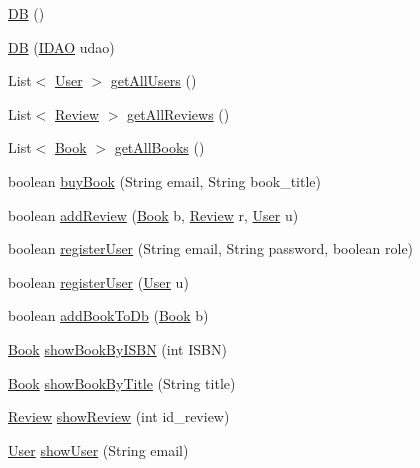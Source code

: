 \begin{DoxyCompactItemize}
\item 
\hyperlink{classdb_1_1_d_b_a1f91d243772e38f908a993724eb01243}{DB} ()
\item 
\hyperlink{classdb_1_1_d_b_afdc419eebbdef14244d859ac59d19dc7}{DB} (\hyperlink{interfacedb_1_1_i_d_a_o}{I\+D\+AO} udao)
\item 
List$<$ \hyperlink{classserver_1_1data_1_1_user}{User} $>$ \hyperlink{classdb_1_1_d_b_ad02e4c78f9afe64af34fb2e5889ce501}{get\+All\+Users} ()
\item 
List$<$ \hyperlink{classserver_1_1data_1_1_review}{Review} $>$ \hyperlink{classdb_1_1_d_b_ac7a84c5621f4ad2263cd830dbf10842e}{get\+All\+Reviews} ()
\item 
List$<$ \hyperlink{classserver_1_1data_1_1_book}{Book} $>$ \hyperlink{classdb_1_1_d_b_ab4fbfd3716967ce37cc462ca04c68ca8}{get\+All\+Books} ()
\item 
boolean \hyperlink{classdb_1_1_d_b_a8a1a15bae4352c3c73092d801ef26c41}{buy\+Book} (String email, String book\+\_\+title)
\item 
boolean \hyperlink{classdb_1_1_d_b_accfa7c2f48252f167576221dc14ff721}{add\+Review} (\hyperlink{classserver_1_1data_1_1_book}{Book} b, \hyperlink{classserver_1_1data_1_1_review}{Review} r, \hyperlink{classserver_1_1data_1_1_user}{User} u)
\item 
boolean \hyperlink{classdb_1_1_d_b_a76fac3ed38eaecd5a073224d6ad51332}{register\+User} (String email, String password, boolean role)
\item 
boolean \hyperlink{classdb_1_1_d_b_aa767c59cde3ca8f76c3acbd0c5348608}{register\+User} (\hyperlink{classserver_1_1data_1_1_user}{User} u)
\item 
boolean \hyperlink{classdb_1_1_d_b_a705ed9c0ffae567ec3ac09fbd7138c6f}{add\+Book\+To\+Db} (\hyperlink{classserver_1_1data_1_1_book}{Book} b)
\item 
\hyperlink{classserver_1_1data_1_1_book}{Book} \hyperlink{classdb_1_1_d_b_ae902ce95ca7433f1f7f77419f4121f4c}{show\+Book\+By\+I\+S\+BN} (int I\+S\+BN)
\item 
\hyperlink{classserver_1_1data_1_1_book}{Book} \hyperlink{classdb_1_1_d_b_a22a4c5b98facd4506b03828697220773}{show\+Book\+By\+Title} (String title)
\item 
\hyperlink{classserver_1_1data_1_1_review}{Review} \hyperlink{classdb_1_1_d_b_a84b36a9e2c155b1aa2868844cd157df7}{show\+Review} (int id\+\_\+review)
\item 
\hyperlink{classserver_1_1data_1_1_user}{User} \hyperlink{classdb_1_1_d_b_a914986669ac622ef33ae344baaefa32c}{show\+User} (String email)

\end{DoxyCompactItemize}
